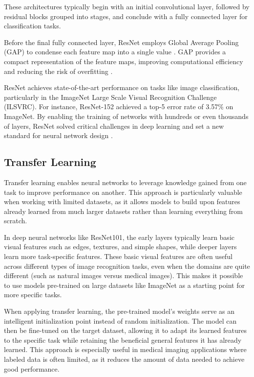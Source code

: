 These architectures typically begin with an initial convolutional layer, followed by residual blocks grouped into stages, and conclude with a fully connected layer for classification tasks. 

Before the final fully connected layer, ResNet employs Global Average Pooling (GAP) to condense each feature map into a single value \cite{he2015deepresiduallearningimage}. GAP provides a compact representation of the feature maps, improving computational efficiency and reducing the risk of overfitting \cite{he2015deepresiduallearningimage}. 

ResNet achieves state-of-the-art performance on tasks like image classification, particularly in the ImageNet Large Scale Visual Recognition Challenge (ILSVRC). For instance, ResNet-152 achieved a top-5 error rate of 3.57\% on ImageNet. By enabling the training of networks with hundreds or even thousands of layers, ResNet solved critical challenges in deep learning and set a new standard for neural network design \cite{he2015deepresiduallearningimage}.

\subsection{Transfer Learning}
Transfer learning enables neural networks to leverage knowledge gained from one task to improve performance on another. This approach is particularly valuable when working with limited datasets, as it allows models to build upon features already learned from much larger datasets rather than learning everything from scratch.

In deep neural networks like ResNet101, the early layers typically learn basic visual features such as edges, textures, and simple shapes, while deeper layers learn more task-specific features. These basic visual features are often useful across different types of image recognition tasks, even when the domains are quite different (such as natural images versus medical images). This makes it possible to use models pre-trained on large datasets like ImageNet as a starting point for more specific tasks.

When applying transfer learning, the pre-trained model's weights serve as an intelligent initialization point instead of random initialization. The model can then be fine-tuned on the target dataset, allowing it to adapt its learned features to the specific task while retaining the beneficial general features it has already learned. This approach is especially useful in medical imaging applications where labeled data is often limited, as it reduces the amount of data needed to achieve good performance.


